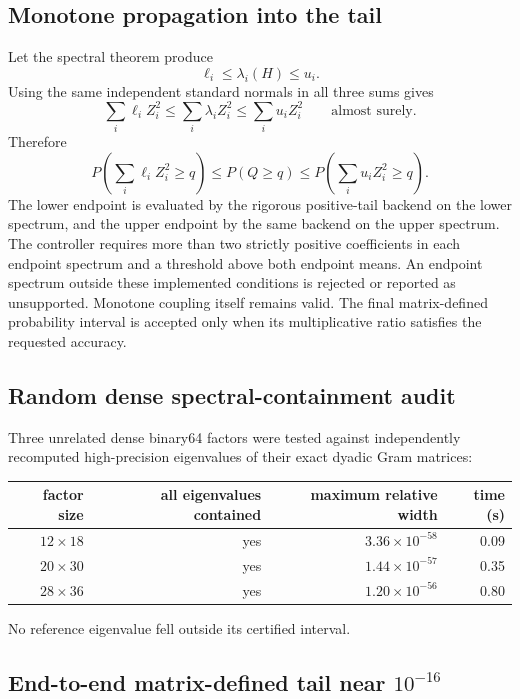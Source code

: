 \subsection{Monotone propagation into the tail}

Let the spectral theorem produce
\[
\ell_i\le\lambda_i(H)\le u_i.
\]
Using the same independent standard normals in all three sums gives
\[
\sum_i\ell_iZ_i^2
\le
\sum_i\lambda_iZ_i^2
\le
\sum_i u_iZ_i^2
\qquad\text{almost surely}.
\]
Therefore
\[
\boxed{
P\!\left(\sum_i\ell_iZ_i^2\ge q\right)
\le
P(Q\ge q)
\le
P\!\left(\sum_i u_iZ_i^2\ge q\right).
}
\]
The lower endpoint is evaluated by the rigorous positive-tail backend on the
lower spectrum, and the upper endpoint by the same backend on the upper
spectrum.  The controller requires more than two strictly positive
coefficients in each endpoint spectrum and a threshold above both endpoint
means.  An endpoint spectrum outside these implemented conditions is rejected
or reported as unsupported. Monotone coupling itself remains valid.  The final matrix-defined probability interval is accepted only when
its multiplicative ratio satisfies the requested accuracy.

\subsection{Random dense spectral-containment audit}

Three unrelated dense binary64 factors were tested against independently
recomputed high-precision eigenvalues of their exact dyadic Gram matrices:

\begin{center}
\begin{tabular}{@{}rrrr@{}}
\toprule
factor size & all eigenvalues contained & maximum relative width & time (s)\\
\midrule
$12\times18$ & yes & $3.36\times10^{-58}$ & 0.09\\
$20\times30$ & yes & $1.44\times10^{-57}$ & 0.35\\
$28\times36$ & yes & $1.20\times10^{-56}$ & 0.80\\
\bottomrule
\end{tabular}
\end{center}

No reference eigenvalue fell outside its certified interval.

\subsection{End-to-end matrix-defined tail near \texorpdfstring{\(10^{-16}\)}{1e-16}}

